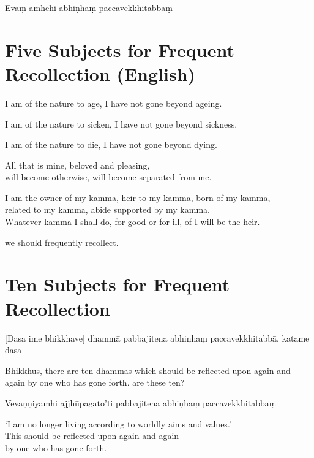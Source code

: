 Evaṃ amhehi abhiṇhaṃ paccavekkhitabbaṃ


\section{Five Subjects for Frequent Recollection (English)}

I am of the nature to age, I have not gone beyond ageing.

I am of the nature to sicken, I have not gone beyond sickness.

I am of the nature to die, I have not gone beyond dying.

All that is mine, beloved and pleasing,\\
will become otherwise, will become separated from me.

I am the owner of my kamma, heir to my kamma, born of my kamma,\\
related to my kamma, abide supported by my kamma.\\
Whatever kamma I shall do, for good or for ill, of  I will be the heir.

 we should frequently recollect.

\section{Ten Subjects for Frequent Recollection}


\begin{leader}
\end{leader}

[Dasa ime bhikkhave] dhammā pabbajitena abhiṇhaṃ paccavekkhitabbā, katame dasa

\begin{english}
  Bhikkhus, there are ten dhammas which should be reflected upon again and again by one who has gone forth.  are these ten?
\end{english}

Vevaṇṇiyamhi ajjhūpagato'ti pabbajitena abhiṇhaṃ paccavekkhitabbaṃ

\begin{english}
  `I am no longer living according to worldly aims and values.'\\
  This should be reflected upon again and again\\
  by one who has gone forth.
\end{english}

